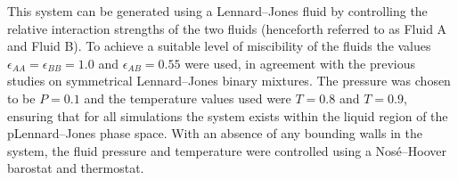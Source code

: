 This system can be generated using a Lennard--Jones fluid by controlling the relative interaction strengths of the two fluids (henceforth referred to as Fluid A and Fluid B).
To achieve a suitable level of miscibility of the fluids the values $\epsilon_{AA} = \epsilon_{BB} = 1.0$ and $\epsilon_{AB}=0.55$ were used, in agreement with the previous studies on symmetrical Lennard--Jones binary mixtures.\cite{MorenzoRazo,Blas}
The pressure was chosen to be $P=0.1$ and the temperature values used were $T=0.8$ and $T=0.9$, ensuring that for all simulations the system exists within the liquid region of the pLennard--Jones phase space.\cite{Smit}
With an absence of any bounding walls in the system, the fluid pressure and temperature were controlled using a Nos\'{e}--Hoover barostat and thermostat.

